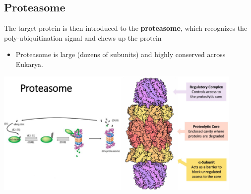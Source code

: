 \documentclass[10pt]{article}
\begin{document}
\subsection*{Proteasome}
The target protein is then introduced to the \textbf{proteasome}, which recognizes the poly-ubiquitination signal and chews up the protein
\begin{itemize}
    \item Proteasome is large (dozens of subunits) and highly conserved across Eukarya.
\end{itemize}
\begin{center}
    \includegraphics*[width=0.9\textwidth]{L1_8.png}
\end{center}
\end{document}
